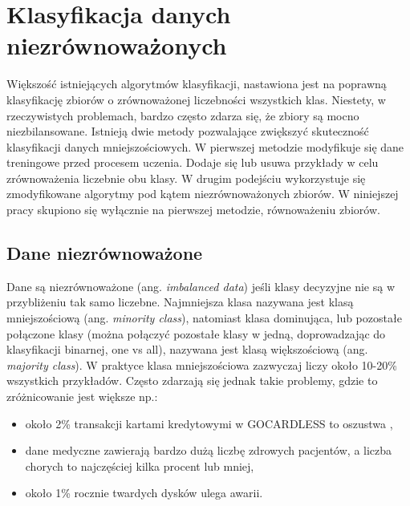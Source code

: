 \chapter{Klasyfikacja danych niezrównoważonych}
Większość istniejących algorytmów klasyfikacji, nastawiona jest na poprawną klasyfikację zbiorów o zrównoważonej liczebności wszystkich klas. Niestety, w rzeczywistych problemach, bardzo często zdarza się, że zbiory są mocno niezbilansowane. Istnieją dwie metody pozwalające zwiększyć skuteczność klasyfikacji danych mniejszościowych. W pierwszej metodzie modyfikuje się dane treningowe przed procesem uczenia. Dodaje się lub usuwa przykłady w celu zrównoważenia liczebnie obu klasy. W drugim podejściu wykorzystuje się zmodyfikowane algorytmy pod kątem niezrównoważonych zbiorów. W niniejszej pracy skupiono się wyłącznie na pierwszej metodzie, równoważeniu zbiorów.	
\section{Dane niezrównoważone}
Dane są niezrównoważone (ang. \textit{imbalanced data}) jeśli klasy decyzyjne nie są w przybliżeniu tak samo liczebne. Najmniejsza klasa nazywana jest klasą mniejszościową (ang. \textit{minority class}), natomiast klasa dominująca, lub pozostałe połączone klasy (można połączyć pozostałe klasy w jedną, doprowadzając do klasyfikacji binarnej, one vs all), nazywana jest klasą większościową (ang. \textit{majority class}). W praktyce klasa mniejszościowa zazwyczaj liczy około 10-20\% wszystkich przykładów. Często zdarzają się jednak takie problemy, gdzie to zróżnicowanie jest większe np.:
\begin{itemize}
	\item około 2\% transakcji kartami kredytowymi w GOCARDLESS to oszustwa \cite{gocardless},
	\item dane medyczne zawierają bardzo dużą liczbę zdrowych pacjentów, a liczba chorych to najczęściej kilka procent lub mniej,
	\item około 1\% rocznie twardych dysków ulega awarii.
	
\end{itemize}

